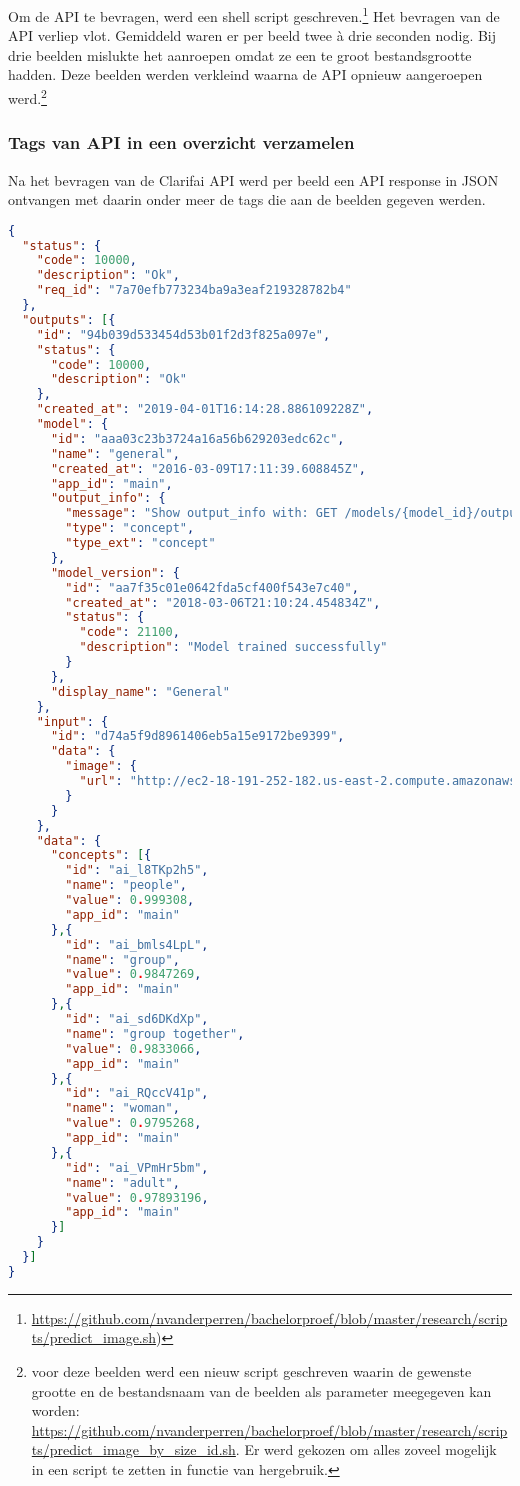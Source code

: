 Om de API te bevragen, werd een shell script geschreven.\footnote{\url{https://github.com/nvanderperren/bachelorproef/blob/master/research/scripts/predict_image.sh})} Het bevragen van de API verliep vlot. Gemiddeld waren er per beeld twee à drie seconden nodig. Bij drie beelden mislukte het aanroepen omdat ze een te groot bestandsgrootte hadden. Deze beelden werden verkleind waarna de API opnieuw aangeroepen werd.\footnote{voor deze beelden werd een nieuw script geschreven waarin de gewenste grootte en de bestandsnaam van de beelden als parameter meegegeven kan worden: \url{https://github.com/nvanderperren/bachelorproef/blob/master/research/scripts/predict_image_by_size_id.sh}. Er werd gekozen om alles zoveel mogelijk in een script te zetten in functie van hergebruik.}

\subsubsection{Tags van API in een overzicht verzamelen}
\label{subsubsec:tags-verzamelen-overzicht}

Na het bevragen van de Clarifai API werd per beeld een API response in JSON ontvangen met daarin onder meer de tags die aan de beelden gegeven werden.

\begin{lstlisting}[language=json,caption=een ingekorte versie van een ontvangen API response met voorspellingen van Clarifai .]
{
  "status": {
    "code": 10000,
    "description": "Ok",
    "req_id": "7a70efb773234ba9a3eaf219328782b4"
  },
  "outputs": [{
    "id": "94b039d533454d53b01f2d3f825a097e",
    "status": {
      "code": 10000,
      "description": "Ok"
    },
    "created_at": "2019-04-01T16:14:28.886109228Z",
    "model": {
      "id": "aaa03c23b3724a16a56b629203edc62c",
      "name": "general",
      "created_at": "2016-03-09T17:11:39.608845Z",
      "app_id": "main",
      "output_info": {
        "message": "Show output_info with: GET /models/{model_id}/output_info",
        "type": "concept",
        "type_ext": "concept"
      },
      "model_version": {
        "id": "aa7f35c01e0642fda5cf400f543e7c40",
        "created_at": "2018-03-06T21:10:24.454834Z",
        "status": {
       	  "code": 21100,
          "description": "Model trained successfully"
        }
      },
      "display_name": "General"
   	},
    "input": {
      "id": "d74a5f9d8961406eb5a15e9172be9399",
      "data": {
        "image": {
          "url": "http://ec2-18-191-252-182.us-east-2.compute.amazonaws.com:8182/iiif/2/FO-30-00197/full/full/0/default.jpg"
        }
      }
    },
    "data": {
      "concepts": [{
        "id": "ai_l8TKp2h5",
        "name": "people",
        "value": 0.999308,
        "app_id": "main"
      },{
        "id": "ai_bmls4LpL",
        "name": "group",
        "value": 0.9847269,
        "app_id": "main"
      },{
        "id": "ai_sd6DKdXp",
        "name": "group together",
        "value": 0.9833066,
        "app_id": "main"
      },{
        "id": "ai_RQccV41p",
        "name": "woman",
        "value": 0.9795268,
        "app_id": "main"
      },{
        "id": "ai_VPmHr5bm",
        "name": "adult",
        "value": 0.97893196,
        "app_id": "main"
      }]
    }
  }]
}
\end{lstlisting}

